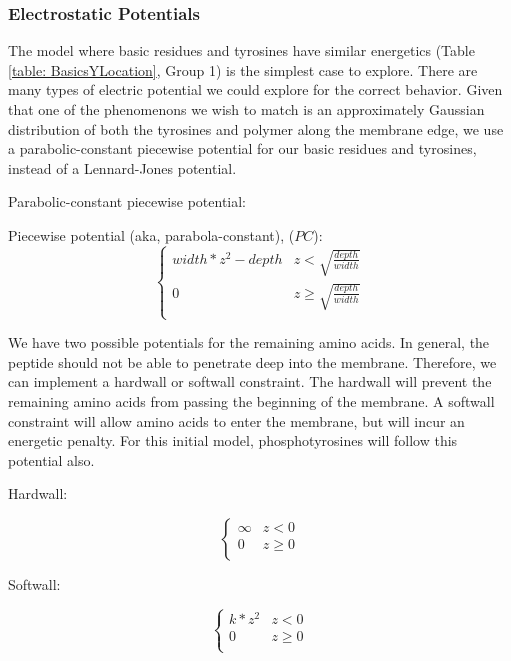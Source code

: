 \documentclass[../../AdvancementSummary.tex]{subfiles}
\begin{document}
{\subsubsection{Electrostatic Potentials}

The model where basic residues and tyrosines have similar energetics (Table \ref{table: BasicsYLocation}, Group 1) is the simplest case to explore. There are many types of electric potential we could explore for the correct behavior.  Given that one of the phenomenons we wish to match is an approximately Gaussian distribution of both the tyrosines and polymer along the membrane edge, we use a parabolic-constant piecewise potential for our basic residues and tyrosines, instead of a Lennard-Jones potential. 

Parabolic-constant piecewise potential:

Piecewise potential (aka, parabola-constant), ($PC$):
\begin{equation}\label{eq: parabolaconstant}
\begin{cases}
width*z^2-depth 	& z<\sqrt{\frac{depth}{width}}\\
0 & z \geq \sqrt{\frac{depth}{width}} \\
\end{cases}
\end{equation}

We have two possible potentials for the remaining amino acids.  In general, the peptide should not be able to penetrate deep into the membrane. Therefore, we can implement a hardwall or softwall constraint. The hardwall will prevent the remaining amino acids from passing the beginning of the membrane. A softwall constraint will allow amino acids to enter the membrane, but will incur an energetic penalty. For this initial model, phosphotyrosines will follow this potential also.

Hardwall:

\begin{equation}\label{eq: hardwall}
\begin{cases}
\infty 	& z < 0\\
0 & z \geq 0 \\
\end{cases}
\end{equation}


Softwall:

\begin{equation}\label{eq: softwall}
\begin{cases}
k*z^2 	& z < 0\\
0 & z \geq 0 \\
\end{cases}
\end{equation}

}
\end{document}
